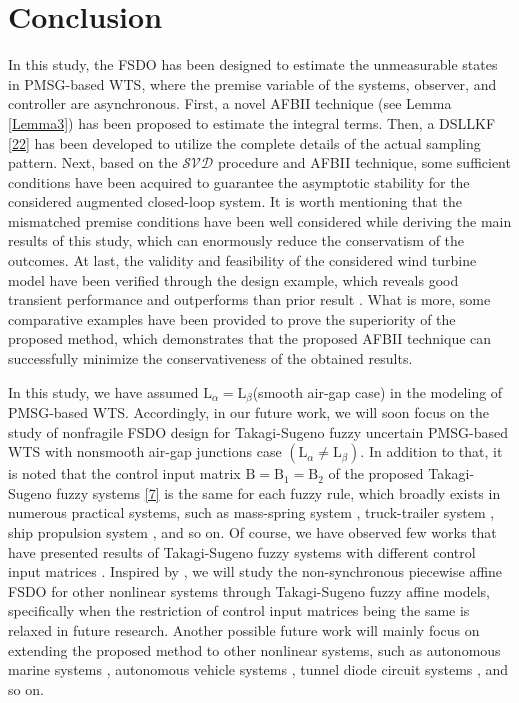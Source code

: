 \documentclass[preprint,11pt]{elsarticle}
\begin{document}
\section{Conclusion}\vspace{-0.3cm}
In this study, the FSDO has been designed to estimate the unmeasurable states in PMSG-based WTS, where the premise variable of the systems, observer, and controller are asynchronous. First, a novel AFBII technique (see Lemma \ref{Lemma3}) has been proposed to estimate the integral terms. Then, a DSLLKF \eqref{22} has been developed to utilize the complete details of the actual sampling pattern. Next, based on the $\mathcal{SVD}$ procedure and AFBII technique, some sufficient conditions have been acquired to guarantee the asymptotic stability for the considered augmented closed-loop system. It is worth mentioning that the mismatched premise conditions have been well considered while deriving the main results of this study, which can enormously reduce the conservatism of the outcomes. At last, the validity and feasibility of the considered wind turbine model have been verified through the design example, which reveals good transient performance and outperforms than prior result \cite{sub1}. What is more, some comparative examples have been provided to prove the superiority of the proposed method, which demonstrates that the proposed AFBII technique can successfully minimize the conservativeness of the obtained results.

{In this study, we have assumed $\mathrm{L}_{\alpha}=\mathrm{L}_{\beta}$(smooth air-gap case) in the modeling of PMSG-based WTS. Accordingly, in our future work,  we will soon focus on the study of nonfragile FSDO design for {Takagi-Sugeno} fuzzy uncertain PMSG-based WTS with nonsmooth air-gap junctions case $(\mathrm{L}_{\alpha}\neq\mathrm{L}_{\beta})$. In addition to that, it is noted that the control input matrix $\mathrm{B}=\mathrm{B}_{1}=\mathrm{B}_{2}$ of the proposed {Takagi-Sugeno} fuzzy systems \eqref{7} is the same for each fuzzy rule, which broadly exists in numerous practical systems, such as mass-spring system \cite{Mass}, truck-trailer system \cite{example1a}, ship propulsion system \cite{lem1}, and so on. Of course, we have observed few works that have presented results of {Takagi-Sugeno} fuzzy systems with different control input matrices \cite{FD-1}. Inspired by \cite{FD-1}, we will study the non-synchronous piecewise affine FSDO for other nonlinear systems through {Takagi-Sugeno} fuzzy affine models, specifically when the restriction of control input matrices being the same is relaxed in future research. Another possible future work will mainly focus on extending the proposed method to other nonlinear systems, such as  autonomous marine systems \cite{UMV-1}, autonomous vehicle systems \cite{UMV-2}, tunnel diode circuit systems \cite{UMV-3}, and so on.}
\end{document}
